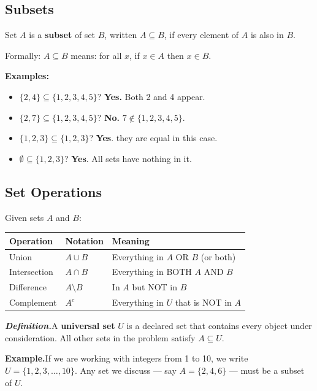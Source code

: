 \documentclass[12pt]{article}
\begin{document}
\bigskip
\newpage
\subsection*{Subsets}
Set $A$ is a \textbf{subset} of set $B$, written $A \subseteq B$,
if every element of $A$ is also in $B$.

Formally: $A \subseteq B$ means: for all $x$, if $x \in A$ then $x \in B$.

\textbf{Examples:}
\begin{itemize}
  \item $\{2,4\} \subseteq \{1,2,3,4,5\}$? \textbf{Yes.} Both 2 and 4 appear.
  \item $\{2,7\} \subseteq \{1,2,3,4,5\}$? \textbf{No.} $7 \notin \{1,2,3,4,5\}$.
  \item $\{1,2,3\} \subseteq \{1,2,3\}$? \textbf{Yes}. they are equal in this case.
  \item $\emptyset \subseteq \{1,2,3\}$? \textbf{Yes}. All sets have nothing in it.
\end{itemize}

\subsection*{Set Operations}
Given sets $A$ and $B$:

\medskip
\renewcommand{\arraystretch}{1.8}
\begin{tabular}{@{} p{3.5cm} p{3cm} p{7cm} @{}}
\toprule
Operation & Notation & Meaning \\
\midrule
Union        & $A \cup B$ & Everything in $A$ OR $B$ (or both) \\
Intersection & $A \cap B$ & Everything in BOTH $A$ AND $B$ \\
Difference   & $A \setminus B$ & In $A$ but NOT in $B$ \\
Complement   & $A^c$      & Everything in $U$ that is NOT in $A$ \\
\bottomrule
\end{tabular}
\renewcommand{\arraystretch}{1}

\textit{\textbf{Definition.}}\quad A \textbf{universal set} $U$ is a declared set that contains every object
under consideration. All other sets in the problem satisfy $A \subseteq U$.

\medskip
\textbf{Example.}\quad If we are working with integers from 1 to 10,
we write $U = \{1, 2, 3, \ldots, 10\}$.
Any set we discuss --- say $A = \{2, 4, 6\}$ --- must be a subset of $U$.
\end{document}
